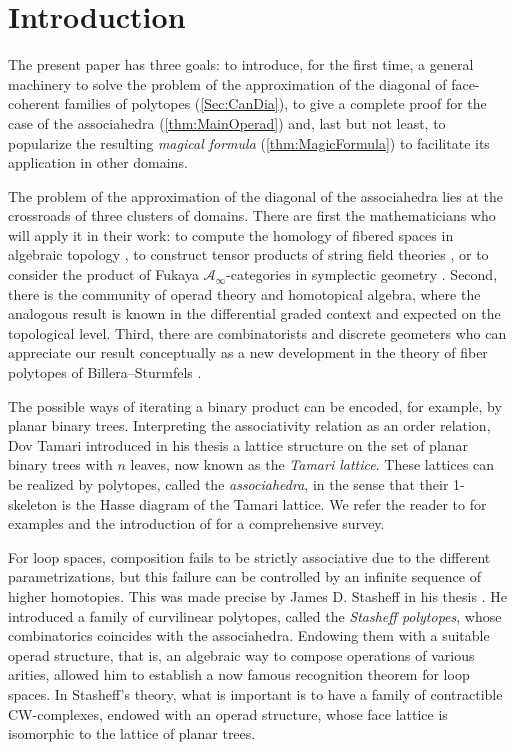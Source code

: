 \documentclass[11pt]{article}
\numberwithin{equation}{section}\providecommand{\No}{}
\let\mathcal\mathscr
\theoremstyle{plain}
\theoremstyle{definition}
\begin{document}
\section*{Introduction}

The present paper has three goals: to introduce, for the first time, a general machinery to solve the problem of the approximation of the diagonal of face-coherent families of polytopes (\cref{Sec:CanDia}), to give a complete proof for the case of the associahedra (\cref{thm:MainOperad}) and, last but not least, to popularize the resulting \emph{magical formula} (\cref{thm:MagicFormula}) to facilitate its application in other domains.

The problem of the approximation of the diagonal of the associahedra lies at the crossroads of three clusters of domains.
There are first the mathematicians who will apply it in their work:
to compute the homology of fibered spaces in algebraic topology \cite{Brown59, Proute11}, to construct tensor products of string field theories
\cite{GaberdielZwiebach97}, or to consider the product of Fukaya $\mathcal{A}_\infty$-categories in symplectic geometry \cite{Seidel08, Amorim17}. Second, there is the community of operad theory and homotopical algebra, where the analogous result is known in the differential graded context \cite{SaneblidzeUmble04, MarklShnider06} and expected on the topological level. Third, there are combinatorists and discrete geometers who can appreciate our result conceptually as a new development in the theory of fiber polytopes of Billera--Sturmfels \cite{BilleraSturmfels92}.

The possible ways of iterating a binary product can be encoded, for example, by planar binary trees. Interpreting the associativity relation as an order relation, Dov Tamari introduced in his thesis \cite{Tamari51} a lattice structure on the set of planar binary trees with $n$ leaves, now known as the \emph{Tamari lattice}. These lattices can be realized by polytopes, called the \emph{associahedra}, in the sense that their 1-skeleton is the Hasse diagram of the Tamari lattice. We refer the reader to \cite{CFZ02, GKZ08, Loday04a} for examples and the introduction of \cite{CSZ15} for a comprehensive survey.

For loop spaces, composition fails to be strictly associative due to the different parametrizations, but this failure can be controlled by an infinite sequence of higher homotopies. This was made precise by James D. Stasheff in his thesis \cite{Stasheff63}. He introduced a family of curvilinear polytopes, called the \emph{Stasheff polytopes}, whose combinatorics coincides with the associahedra. Endowing them with a suitable operad structure, that is, an algebraic way to compose operations of various arities, allowed him to establish a now famous recognition theorem for loop spaces. In Stasheff's theory, what is important is to have
a family of contractible CW-complexes, endowed with an operad structure, whose face lattice is isomorphic to the lattice of planar trees.
\end{document}
